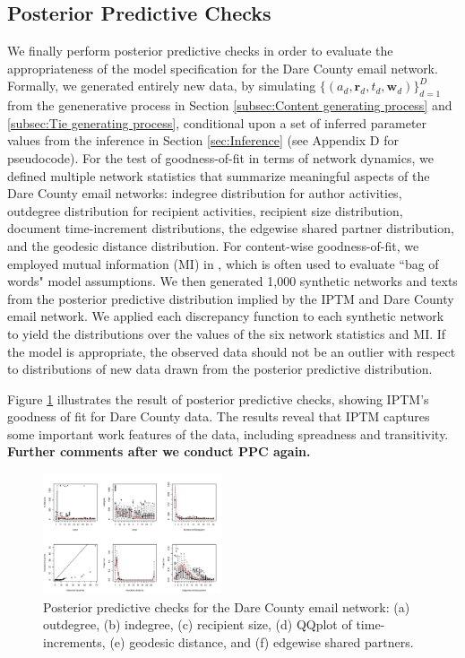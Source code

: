 \documentclass[twoside]{article}
\begin{document}
\subsection{Posterior Predictive Checks}\label{subsec:PPC}
We finally perform posterior predictive checks \cite{rubin1984bayesianly} in order to evaluate the appropriateness of the model specification for the Dare County email network. Formally, we generated entirely new data, by simulating $\{(a_{d}, \boldsymbol{r}_{d}, t_{d}, \boldsymbol{w}_{d})\}_{d=1}^D$ from the genenerative process in Section \ref{subsec:Content generating process} and \ref{subsec:Tie generating process}, conditional upon a set of inferred parameter values from the inference in Section \ref{sec:Inference} (see Appendix D for pseudocode). For the test of goodness-of-fit in terms of network dynamics, we defined multiple network statistics that summarize meaningful aspects of the Dare County email networks: indegree distribution for author activities, outdegree distribution for recipient activities, recipient size distribution, document time-increment distributions, the edgewise shared partner distribution, and the geodesic distance distribution. For content-wise goodness-of-fit, we employed mutual information (MI) in \cite{mimno2011bayesian}, which is often used to evaluate ``bag of words" model assumptions. We then generated 1,000 synthetic networks and texts from the posterior predictive distribution implied by the IPTM and Dare County email network.
We applied each discrepancy function to each synthetic network to yield the distributions over the values of the six network statistics and MI. If the model is appropriate, the observed data should not be an outlier with respect to distributions of new data drawn from the posterior predictive distribution. 

Figure \ref{fig:PPC} illustrates the result of posterior predictive checks, showing IPTM's goodness of fit for Dare County data. The results reveal that IPTM captures some important work features of the data, including spreadness and transitivity. \textbf{Further comments after we conduct PPC again.}
	\begin{figure}[h]
		\centering
		\includegraphics[width = 0.47\textwidth]{plots/PPC_plot.pdf}
		\caption{Posterior predictive checks for the Dare County email network: (a) outdegree, (b) indegree, (c) recipient size, (d) QQplot of time-increments, (e) geodesic distance, and (f) edgewise shared partners.}
		\label{fig:PPC}
	\end{figure}
\end{document}
